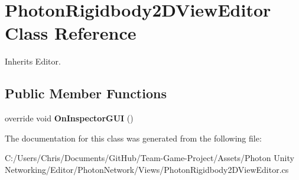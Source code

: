 \hypertarget{class_photon_rigidbody2_d_view_editor}{}\section{Photon\+Rigidbody2\+D\+View\+Editor Class Reference}
\label{class_photon_rigidbody2_d_view_editor}


Inherits Editor.

\subsection*{Public Member Functions}
\begin{DoxyCompactItemize}
\item 
override void {\bfseries On\+Inspector\+G\+UI} ()\hypertarget{class_photon_rigidbody2_d_view_editor_a1a5ec67e72c24325621732f9ffc6e753}{}\label{class_photon_rigidbody2_d_view_editor_a1a5ec67e72c24325621732f9ffc6e753}

\end{DoxyCompactItemize}


The documentation for this class was generated from the following file\+:\begin{DoxyCompactItemize}
\item 
C\+:/\+Users/\+Chris/\+Documents/\+Git\+Hub/\+Team-\/\+Game-\/\+Project/\+Assets/\+Photon Unity Networking/\+Editor/\+Photon\+Network/\+Views/Photon\+Rigidbody2\+D\+View\+Editor.\+cs\end{DoxyCompactItemize}
